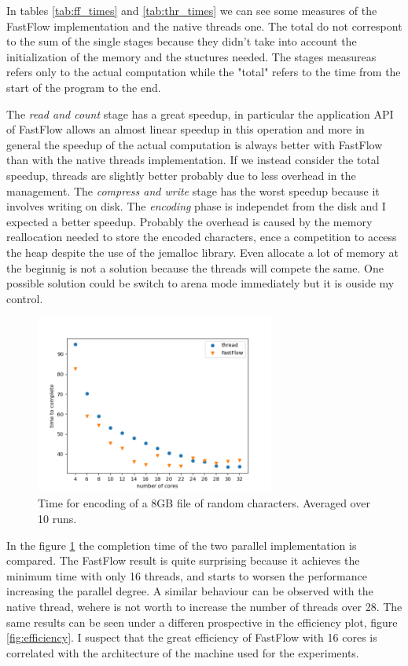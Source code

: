 \documentclass[12pt, letterpaper]{article}
\begin{document}
In tables \ref{tab:ff_times} and \ref{tab:thr_times} we can see some measures of the FastFlow implementation and the native threads one. The total do not correspont to the sum of the single stages because they didn't take into account the initialization of the memory and the stuctures needed. The stages measureas refers only to the actual computation while the "total" refers to the time from the start of the program to the end.

The \textit{read and count} stage has a great speedup, in particular the application API of FastFlow allows an almost linear speedup in this operation and more in general the speedup of the actual computation is always better with FastFlow than with the native threads implementation. If we instead consider the total speedup, threads are slightly better probably due to less overhead in the management. The \textit{compress and write} stage has the worst speedup because it involves writing on disk. The \textit{encoding} phase is independet from the disk and I expected a better speedup. Probably the overhead is caused by the memory reallocation needed to store the encoded characters, ence a competition to access the heap despite the use of the jemalloc library. Even allocate a lot of memory at the beginnig is not a solution because the threads will compete the same. One possible solution could be switch to arena mode immediately but it is ouside my control.

\begin{figure}
    \centering
    \includegraphics[width=0.7\textwidth]{./images/time_to_complete.png}
    \caption{Time for encoding of a 8GB file of random characters. Averaged over 10 runs.}
    \label{fig:time_to_complete}
\end{figure}

In the figure \ref{fig:time_to_complete} the completion time of the two parallel implementation is compared. The FastFlow result is quite surprising because it achieves the minimum time with only 16 threads, and starts to worsen the performance increasing the parallel degree. A similar behaviour can be observed with the native thread, wehere is not worth to increase the number of threads over 28. The same results can be seen under a differen prospective in the efficiency plot, figure \ref{fig:efficiency}. I suspect that the great efficiency of FastFlow with 16 cores is correlated with the architecture of the machine used for the experiments.
\end{document}
